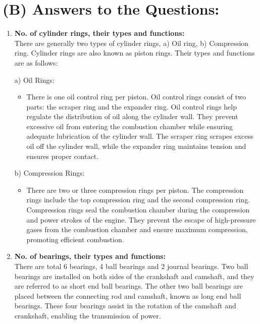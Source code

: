 \documentclass[12pt]{article}
\begin{document}
\section*{(B) Answers to the Questions:}
\begin{enumerate}[label=(\roman*)]
    \item \textbf{No. of cylinder rings, their types and functions:} \\
    There are generally two types of cylinder rings, a) Oil ring, b) Compression ring. Cylinder rings are also known as piston rings. Their types and functions are as follows:
    
    a) Oil Rings:
    \begin{itemize}
      \item There is one oil control ring per piston. Oil control rings consist of two parts: the scraper ring and the expander ring. Oil control rings help regulate the distribution of oil along the cylinder wall. They prevent excessive oil from entering the combustion chamber while ensuring adequate lubrication of the cylinder wall. The scraper ring scrapes excess oil off the cylinder wall, while the expander ring maintains tension and ensures proper contact.
    \end{itemize}
    
    b) Compression Rings:
    \begin{itemize}
      \item There are two or three compression rings per piston. The compression rings include the top compression ring and the second compression ring.
      Compression rings seal the combustion chamber during the compression and power strokes of the engine. They prevent the escape of high-pressure gases from the combustion chamber and ensure maximum compression, promoting efficient combustion.
    \end{itemize}
    
    \vspace*{0.3cm}
    
    \item \textbf{No. of bearings, their types and functions:} \\
    There are total 6 bearings, 4 ball bearings and 2 journal bearings. Two ball bearings are installed on both sides of the crankshaft and camshaft, and they are referred to as short end ball bearings. The other two ball bearings are placed between the connecting rod and camshaft, known as long end ball bearings. These four bearings assist in the rotation of the camshaft and crankshaft, enabling the transmission of power.


\end{enumerate}
\end{document}
